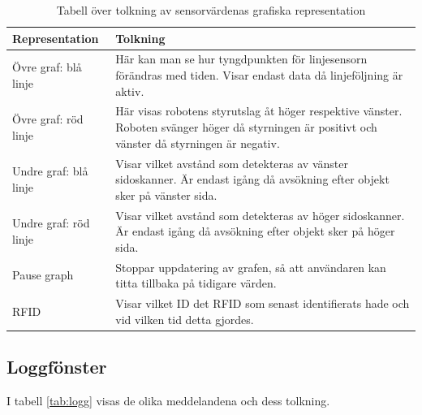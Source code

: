\documentclass[a4paper,12pt]{article}
\begin{document}
\begin{table}[H]
    \centering
    \begin{tabularx}{\textwidth}{|l|X|}
        \hline \textbf{Representation} & \textbf{Tolkning} \\ \hline
        Övre graf: blå linje & Här kan man se hur tyngdpunkten för linjesensorn förändras med tiden. Visar endast data då linjeföljning är aktiv.\\ \hline
        Övre graf: röd linje & Här visas robotens styrutslag åt höger respektive vänster. Roboten svänger höger då styrningen är positivt och vänster då styrningen är negativ.\\ \hline
        Undre graf: blå linje & Visar vilket avstånd som detekteras av vänster sidoskanner. Är endast igång då avsökning efter objekt sker på vänster sida. \\ \hline
        Undre graf: röd linje & Visar vilket avstånd som detekteras av höger sidoskanner. Är endast igång då avsökning efter objekt sker på höger sida. \\ \hline
        Pause graph & Stoppar uppdatering av grafen, så att användaren kan titta tillbaka på tidigare värden.\\ \hline
        RFID & Visar vilket ID det RFID som senast identifierats hade och vid vilken tid detta gjordes. \\ \hline
    \end{tabularx}
\caption{Tabell över tolkning av sensorvärdenas grafiska representation}
\label{tab:sensor}
\end{table}

\subsection{Loggfönster}
\label{subsec:logg}
I tabell \ref{tab:logg} visas de olika meddelandena och dess tolkning.
\end{document}
